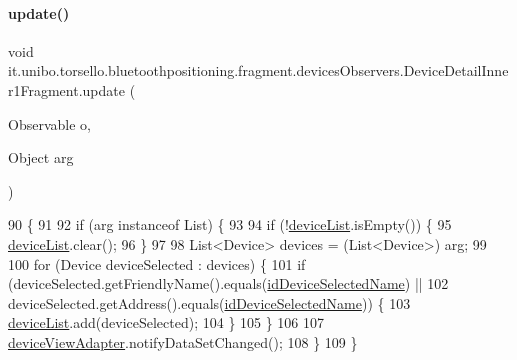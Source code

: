 \paragraph{\texorpdfstring{update()}{update()}}
{\footnotesize\ttfamily void it.\+unibo.\+torsello.\+bluetoothpositioning.\+fragment.\+devices\+Observers.\+Device\+Detail\+Inner1\+Fragment.\+update (\begin{DoxyParamCaption}\item[{Observable}]{o,  }\item[{Object}]{arg }\end{DoxyParamCaption})}


\begin{DoxyCode}
90                                                  \{
91 
92         \textcolor{keywordflow}{if} (arg instanceof List) \{
93 
94             \textcolor{keywordflow}{if} (!\hyperlink{classit_1_1unibo_1_1torsello_1_1bluetoothpositioning_1_1fragment_1_1devicesObservers_1_1DeviceDetailInner1Fragment_ab9fa77b8ee7b5d5fef44743f6f5c8458_ab9fa77b8ee7b5d5fef44743f6f5c8458}{deviceList}.isEmpty()) \{
95                 \hyperlink{classit_1_1unibo_1_1torsello_1_1bluetoothpositioning_1_1fragment_1_1devicesObservers_1_1DeviceDetailInner1Fragment_ab9fa77b8ee7b5d5fef44743f6f5c8458_ab9fa77b8ee7b5d5fef44743f6f5c8458}{deviceList}.clear();
96             \}
97 
98             List<Device> devices = (List<Device>) arg;
99 
100             \textcolor{keywordflow}{for} (Device deviceSelected : devices) \{
101                 \textcolor{keywordflow}{if} (deviceSelected.getFriendlyName().equals(\hyperlink{classit_1_1unibo_1_1torsello_1_1bluetoothpositioning_1_1fragment_1_1devicesObservers_1_1DeviceDetailInner1Fragment_a32265c6cbb2a0695e9c401d3f2acb9d3_a32265c6cbb2a0695e9c401d3f2acb9d3}{idDeviceSelectedName}) ||
102                         deviceSelected.getAddress().equals(\hyperlink{classit_1_1unibo_1_1torsello_1_1bluetoothpositioning_1_1fragment_1_1devicesObservers_1_1DeviceDetailInner1Fragment_a32265c6cbb2a0695e9c401d3f2acb9d3_a32265c6cbb2a0695e9c401d3f2acb9d3}{idDeviceSelectedName})) \{
103                     \hyperlink{classit_1_1unibo_1_1torsello_1_1bluetoothpositioning_1_1fragment_1_1devicesObservers_1_1DeviceDetailInner1Fragment_ab9fa77b8ee7b5d5fef44743f6f5c8458_ab9fa77b8ee7b5d5fef44743f6f5c8458}{deviceList}.add(deviceSelected);
104                 \}
105             \}
106 
107             \hyperlink{classit_1_1unibo_1_1torsello_1_1bluetoothpositioning_1_1fragment_1_1devicesObservers_1_1DeviceDetailInner1Fragment_a981ec49aae98052b414864feb742cbc5_a981ec49aae98052b414864feb742cbc5}{deviceViewAdapter}.notifyDataSetChanged();
108         \}
109     \}
\end{DoxyCode}


